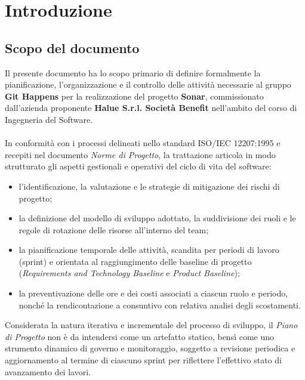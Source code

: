 \noindent{\small \textcolor{gray}{Git Happens}}
\tableofcontents

\section{Introduzione}

\subsection{Scopo del documento}
Il presente documento ha lo scopo primario di definire formalmente la pianificazione, l'organizzazione e il controllo delle attività necessarie al gruppo \textbf{Git Happens} per la realizzazione del progetto \textbf{Sonar}, commissionato dall'azienda proponente \textbf{Halue S.r.l. Società Benefit} nell'ambito del corso di Ingegneria del Software. \\
\\
In conformità con i processi delineati nello standard ISO/IEC 12207:1995 e recepiti nel documento \textit{Norme di Progetto}, la trattazione articola in modo strutturato gli aspetti gestionali e operativi del ciclo di vita del software:
\begin{itemize}
    \item l'identificazione, la valutazione e le strategie di mitigazione dei rischi di progetto;
    \item la definizione del modello di sviluppo adottato, la suddivisione dei ruoli e le regole di rotazione delle risorse all'interno del team;
    \item la pianificazione temporale delle attività, scandita per periodi di lavoro (sprint) e orientata al raggiungimento delle baseline di progetto (\textit{Requirements and Technology Baseline} e \textit{Product Baseline});
    \item la preventivazione delle ore e dei costi associati a ciascun ruolo e periodo, nonché la rendicontazione a consuntivo con relativa analisi degli scostamenti.
\end{itemize}
Considerata la natura iterativa e incrementale del processo di sviluppo, il \textit{Piano di Progetto} non è da intendersi come un artefatto statico, bensì come uno strumento dinamico di governo e monitoraggio, soggetto a revisione periodica e aggiornamento al termine di ciascuno sprint per riflettere l'effettivo stato di avanzamento dei lavori.

